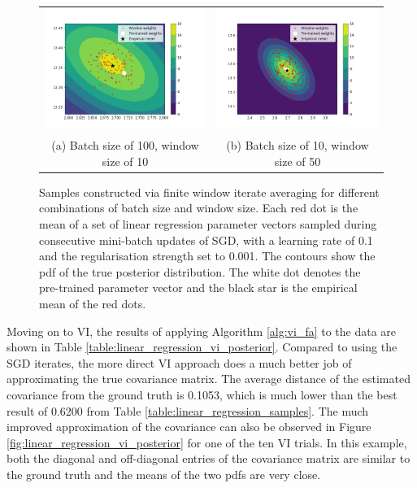 \documentclass[msc,deptreport.inf]{infthesis} %
\begin{document}
\begin{figure}[!htbp] 
	\begin{tabular}{cc}
		 \includegraphics[width=70mm]{plots/linear_model_average_weight_iterates__lr=0.1__lambda=0.001__batch_size=100__window_size=10.png}
		 & \includegraphics[width=70mm]{plots/linear_model_average_weight_iterates__lr=0.1__lambda=0.001__batch_size=10__window_size=50.png} \\
		 (a) Batch size of 100, window size of 10
		 & (b) Batch size of 10, window size of 50 \\[6pt]
	\end{tabular}
	\caption{Samples constructed via finite window iterate averaging for different combinations of batch size and window size. Each red dot is the mean of a set of linear regression parameter vectors sampled during consecutive mini-batch updates of SGD, with a learning rate of 0.1 and the regularisation strength set to 0.001. The contours show the pdf of the true posterior distribution. The white dot denotes the pre-trained parameter vector and the black star is the empirical mean of the red dots.}
	\label{fig:linear_regression_average_iterates}
\end{figure}

Moving on to VI, the results of applying Algorithm \ref{alg:vi_fa} to the data are shown in Table \ref{table:linear_regression_vi_posterior}. Compared to using the SGD iterates, the more direct VI approach does a much better job of approximating the true covariance matrix. The average distance of the estimated covariance from the ground truth is 0.1053, which is much lower than the best result of 0.6200 from Table \ref{table:linear_regression_samples}. The much improved approximation of the covariance can also be observed in Figure \ref{fig:linear_regression_vi_posterior} for one of the ten VI trials. In this example, both the diagonal and off-diagonal entries of the covariance matrix are similar to the ground truth and the means of the two pdfs are very close. 
\end{document}
